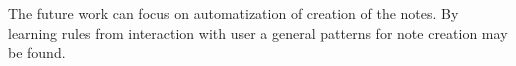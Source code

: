 \documentclass{iitsrc}
\begin{document}
	The future work can focus on automatization of creation of the notes. By learning rules from interaction with user a general patterns for note creation may be found.
	



\end{document}
